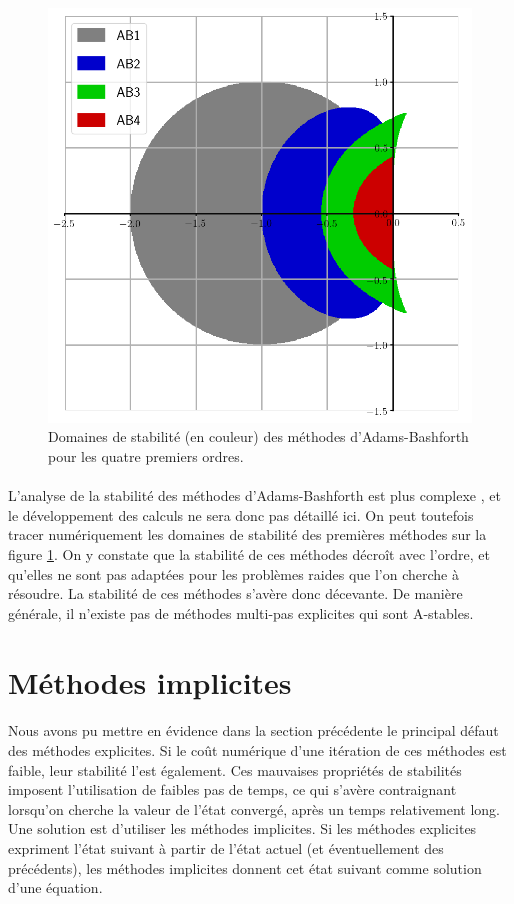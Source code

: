     \begin{figure}
      \centering
      \includegraphics[width=.6\textwidth]{images/ab_stab.png}
      \caption{Domaines de stabilité (en couleur) des méthodes d'Adams-Bashforth pour les quatre premiers ordres.}
      \label{fig:ab_stab}
    \end{figure}

    \paragraph{}
    L'analyse de la stabilité des méthodes d'Adams-Bashforth est plus complexe \cite{HairerNorsettWanner1993, HairerWanner1996}, et le développement des calculs ne sera donc pas détaillé ici.
    On peut toutefois tracer numériquement les domaines de stabilité des premières méthodes sur la figure \ref{fig:ab_stab}.
    On y constate que la stabilité de ces méthodes décroît avec l'ordre, et qu'elles ne sont pas adaptées pour les problèmes raides que l'on cherche à résoudre.
    La stabilité de ces méthodes s'avère donc décevante.
    De manière générale, il n'existe pas de méthodes multi-pas explicites qui sont A-stables.


\section{Méthodes implicites}

  \paragraph{}
  Nous avons pu mettre en évidence dans la section précédente le principal défaut des méthodes explicites.
  Si le coût numérique d'une itération de ces méthodes est faible, leur stabilité l'est également.
  Ces mauvaises propriétés de stabilités imposent l'utilisation de faibles pas de temps, ce qui s'avère contraignant lorsqu'on cherche la valeur de l'état convergé, après un temps relativement long.
  Une solution est d'utiliser les méthodes implicites.
  Si les méthodes explicites expriment l'état suivant à partir de l'état actuel (et éventuellement des précédents), les méthodes implicites donnent cet état suivant comme solution d'une équation.

